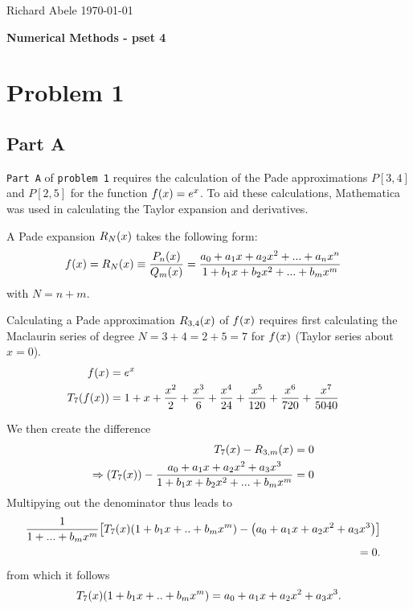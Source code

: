 \documentclass[12pt]{article}
\DeclarePairedDelimiter\rb{(}{)}
\DeclarePairedDelimiter\sqrb{[}{]}
\begin{document}
\noindent Richard Abele \hfill \today \\[30pt]
\centerline{ \Large{ \textbf{ Numerical Methods - pset 4 }}}

\section{Problem 1}
\label{sec:prob1}

	

\subsection{Part A}
\label{subsec:prob1a}

\texttt{Part A} of \texttt{problem 1} requires the calculation of the Pade approximations \(P[3,4]\) and \(P[2,5]\) for the function \(f\rb*{x} = e^{x} \). To aid these calculations, Mathematica was used in calculating the Taylor expansion and derivatives. 

A Pade expansion \(R_{N}\rb*{x}\) takes the following form:
\begin{align*}
	f \rb*{x} & =  R_{N} \rb*{x} \equiv \frac{P_{n}\rb*{x}}{Q_{m}\rb*{x}} = 
	\frac{a_{0} + a_{1} x + a_{2}x^{2} + ... + a_{n}x^{n}}{
		1 + b_{1}x + b_{2}x^{2} + ... + b_{m}x^{m}
	}
\end{align*}
with \(N = n + m\).

Calculating a Pade approximation \(R_{3,4}\rb*{x}\) of \(f\rb*{x}\) requires first calculating the Maclaurin series of degree \(N = 3 + 4 = 2 + 5 = 7\) for \(f\rb*{x}\) (Taylor series about \(x=0\)). 
\begin{align*}
	f\rb*{x} & =  e^{x} &\\
	T_{7}\rb*{f\rb*{x}} & = 1 + x + \frac{x^{2}}{2} + \frac{x^{3}}{6} +
			    \frac{x^{4}}{24} + \frac{x^{5}}{120} + \frac{x^{6}}{720} + \frac{x^{7}}{5040}&\\
\end{align*}

We then create the difference
\begin{align*}
	T_{7}\rb*{x} - R_{3,m}\rb*{x} & =  0 &\\
	\Rightarrow \rb*{ T_{7}\rb*{x} }- 
	\frac{a_{0} + a_{1} x + a_{2}x^{2} + a_{3} x^{3}}{
		1 + b_{1}x + b_{2}x^{2} + ... + b_{m}x^{m}
	} & =  0 &\\
\end{align*}
Multipying out the denominator thus leads to 
\begin{align*}
	\frac{1}{1 + ... + b_{m}x^{m}} \sqrb*{T_{7}\rb*{x} \rb*{1 + b_{1}x + .. + b_{m}x^{m}} -
	\rb*{a_{0} + a_{1}x + a_{2}x^{2} + a_{3}x^{3}}} \\ = 0. &\\
\end{align*}
from which it follows
\begin{align*}
	T_{7}\rb*{x}\rb*{ 1 + b_{1}x + .. + b_{m}x^{m}} 
	= a_{0} + a_{1}x + a_{2}x^{2} + a_{3}x^{3}.
\end{align*}
\end{document}
